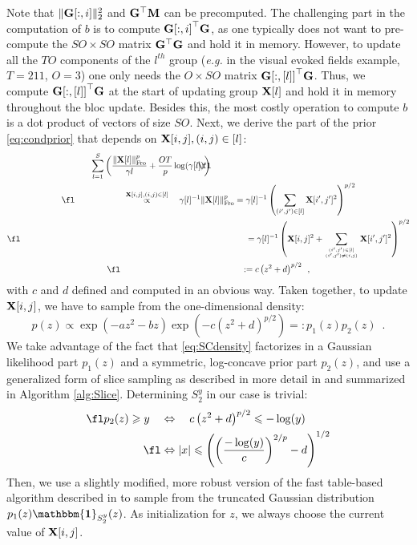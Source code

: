 Note that $\|{\mathbf{G}[:,i]}\|_2^2 $ and $\mathbf{G}^\top \mathbf{M}$ can be precomputed. The challenging part in the computation of $b$ is to compute ${\mathbf{G}[:,i]}^\top \mathbf{G}$, as one typically does not want to pre-compute the $SO \times SO$ matrix $\mathbf{G}^\top \mathbf{G}$ and hold it in memory. However, to update all the $TO$ components of the $l^{th}$ group (\textit{e.g.} in the visual evoked fields example, $T = 211$, $O = 3$) one only needs the $O \times SO$ matrix ${\mathbf{G}[:,[l]]}^\top \mathbf{G}$. Thus, we compute ${\mathbf{G}[:,[l]]}^\top \mathbf{G}$ at the start of updating group $\mathbf{X}[l]$ and hold it in memory throughout the bloc update. Besides this, the most costly operation to compute $b$ is a dot product of vectors of size $SO$. Next, we derive the part of the prior \eqref{eq:condprior} that depends on $\mathbf{X}[i,j], (i,j) \in [l]$:
\begin{gather*}
\fl \hspace{-5cm} \sum_{l=1}^S \left( \frac{\fronorm{\bfX[l]}^p}{\mathbf{\gamma}{l}} + \frac{O T}{p} \log(\mathbf{\gamma}[l])\right) \quad \\
\fl \hspace{2cm} \proptoab{\bfX[i,j], (i,j) \in [l]} \quad \mathbf{\gamma}[l]^{-1} \fronorm{\bfX[l]}^p =  \mathbf{\gamma}[l]^{-1} \left( \sum_{(i',j') \in [l]} \bfX[i',j']^2  \right)^{p/2}  \nonumber \\
\fl \hspace{9.3cm} = \mathbf{\gamma}[l]^{-1} \left(\bfX[i,j]^2 + \sum_{(i',j') \in [l] \atop (i',j') \neq (i,j)} \bfX[i',j']^2  \right)^{p/2} \\
\fl \hspace{5cm} := c \left(z^2 + d \right)^{p/2} \enspace ,
\end{gather*}
with $c$ and $d$ defined and computed in an obvious way. Taken together, to update $\mathbf{X}[i,j]$, we have to sample from the one-dimensional density:
\begin{equation}
p(z) \propto \exp \left(- a z^2 - b z \right) \exp \left(- c \left(z^2 + d \right)^{p/2} \right) =: p_1(z) p_2(z) \enspace . \label{eq:SCdensity}
\end{equation}
We take advantage of the fact that \eqref{eq:SCdensity} factorizes in a Gaussian likelihood part $p_1(z)$ and a symmetric, log-concave prior part $p_2(z)$, and use a generalized form of slice sampling \cite{Ne03,RoCa05} as described in more detail in \cite{Lu16} and summarized in Algorithm \ref{alg:Slice}. Determining $S_2^y$ in our case is trivial:
\begin{align}
\fl p_2(z) \geqslant y \quad & \Leftrightarrow \quad c \left(z^2 + d \right)^{p/2} \leqslant - \log(y) \quad \\
\fl & \Leftrightarrow |x| \leqslant \left( \left( \frac{- \log(y)}{c} \right)^{2/p} - d \right)^{1/2}
\end{align}
Then, we use a slightly modified, more robust version of the fast table-based algorithm described in \cite{Ch12} to sample from the truncated Gaussian distribution $p_1(z) \mathbf{\mathbbm{1}}_{S^y_2}(z)$. As initialization for $z$, we always choose the current value of $\mathbf{X}[i,j]$.

